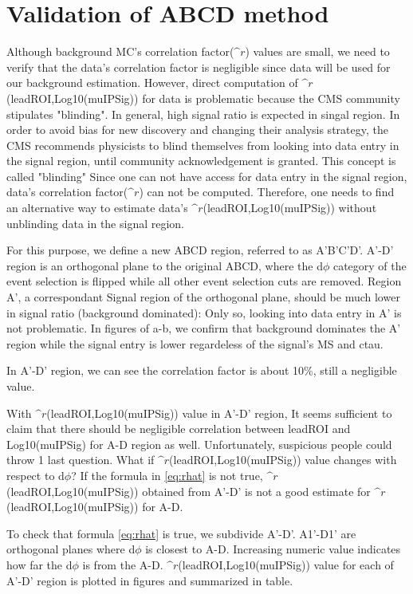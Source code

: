 \section{Validation of ABCD method}

Although background MC's correlation factor($\^{r}$) values are small, we need to verify that the data's correlation factor is negligible since data will be used for our background estimation.
However, direct computation of $\^{r}$(leadROI,Log10(muIPSig)) for data is problematic because the CMS community stipulates "blinding".
In general, high signal ratio is expected in singal region.
In order to avoid bias for new discovery and changing their analysis strategy, the CMS recommends physicists to blind themselves from looking into data entry in the signal region, until community acknowledgement is granted.
This concept is called "blinding"
Since one can not have access for data entry in the signal region, data's correlation factor($\^{r}$) can not be computed. 
Therefore, one needs to find an alternative way to estimate data's $\^{r}$(leadROI,Log10(muIPSig)) without unblinding data in the signal region.

For this purpose, we define a new ABCD region, referred to as A'B'C'D'.
A'-D' region is an orthogonal plane to the original ABCD, where the d$\phi$ category of the event selection is flipped while all other event selection cuts are removed.
Region A', a correspondant Signal region of the orthogonal plane, should be much lower in signal ratio (background dominated): Only so, looking into data entry in A' is not problematic. 
In figures of a-b, we confirm that background dominates the A' region while the signal entry is lower regardeless of the signal's MS and ctau.





In A'-D' region, we can see the correlation factor is about 10\%, still a negligible value. 


With $\^{r}$(leadROI,Log10(muIPSig)) value in A'-D' region, It seems sufficient to claim that there should be negligible correlation between leadROI and Log10(muIPSig) for A-D region as well.
Unfortunately, suspicious people could throw 1 last question.
What if $\^{r}$(leadROI,Log10(muIPSig)) value changes with respect to d$\phi$?
If the formula in \ref{eq:rhat} is not true, $\^{r}$(leadROI,Log10(muIPSig)) obtained from A'-D' is not a good estimate for $\^{r}$(leadROI,Log10(muIPSig)) for A-D.

To check that formula \ref{eq:rhat} is true, we subdivide A'-D'.
A1'-D1' are orthogonal planes where d$\phi$ is closest to A-D.
Increasing numeric value indicates how far the d$\phi$ is from the A-D.
$\^{r}$(leadROI,Log10(muIPSig)) value for each of A'-D' region is plotted in figures and summarized in table.



